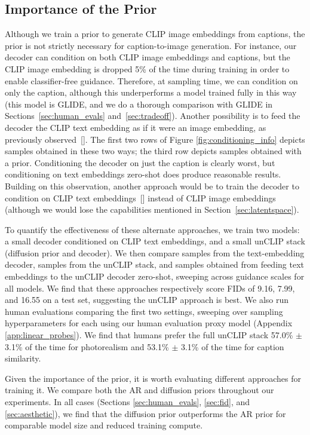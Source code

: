 \subsection{Importance of the Prior}

Although we train a prior to generate CLIP image embeddings from captions, the prior is not strictly necessary for caption-to-image generation. For instance, our decoder can condition on both CLIP image embeddings and captions, but the CLIP image embedding is dropped 5\% of the time during training in order to enable classifier-free guidance. Therefore, at sampling time, we can condition on only the caption, although this underperforms a model trained fully in this way (this model is GLIDE, and we do a thorough comparison with GLIDE in Sections~\ref{sec:human_evals} and~\ref{sec:tradeoff}). Another possibility is to feed the decoder the CLIP text embedding as if it were an image embedding, as previously observed~[]. The first two rows of Figure \ref{fig:conditioning_info} depicts samples obtained in these two ways; the third row depicts samples obtained with a prior. Conditioning the decoder on just the caption is clearly worst, but conditioning on text embeddings zero-shot does produce reasonable results. Building on this observation, another approach would be to train the decoder to condition on CLIP text embeddings~[] instead of CLIP image embeddings (although we would lose the capabilities mentioned in Section~\ref{sec:latentspace}).

To quantify the effectiveness of these alternate approaches, we train two models: a small decoder conditioned on CLIP text embeddings, and a small unCLIP stack (diffusion prior and decoder). We then compare samples from the text-embedding decoder, samples from the unCLIP stack, and samples obtained from feeding text embeddings to the unCLIP decoder zero-shot, sweeping across guidance scales for all models. We find that these approaches respectively score FIDs of 9.16, 7.99, and 16.55 on a test set, suggesting the unCLIP approach is best. We also run human evaluations comparing the first two settings, sweeping over sampling hyperparameters for each using our human evaluation proxy model (Appendix \ref{app:linear_probes}). We find that humans prefer the full unCLIP stack 57.0\% $\pm$ 3.1\% of the time for photorealism and 53.1\% $\pm$ 3.1\% of the time for caption similarity.

Given the importance of the prior, it is worth evaluating different approaches for training it. We compare both the AR and diffusion priors throughout our experiments. In all cases (Sections \ref{sec:human_evals}, \ref{sec:fid}, and \ref{sec:aesthetic}), we find that the diffusion prior outperforms the AR prior for comparable model size and reduced training compute.

